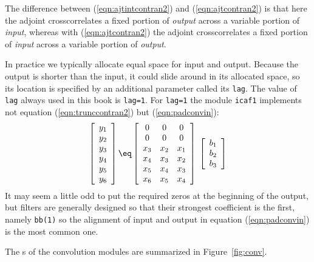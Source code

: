 The difference between (\ref{eqn:ajtintcontran2})
and (\ref{eqn:ajtcontran2}) is that here 
the adjoint crosscorrelates a fixed portion of {\em  output}
across a variable portion of {\em  input},
whereas with (\ref{eqn:ajtcontran2})
the adjoint crosscorrelates a fixed portion of {\em  input}
across a variable portion of {\em  output}.
\par
In practice we typically allocate equal space for input and output.
Because the output is shorter than the input,
it could slide around in its allocated space,
so its location is specified by an additional parameter called its {\tt lag}.
The value of {\tt lag} always used in this book is {\tt lag=1}.
For {\tt lag=1} the module \texttt{icaf1}
implements not equation (\ref{eqn:trunccontran2})
but (\ref{eqn:padconvin}):
\begin{equation}
\left[ 
\begin{array}{c}
  y_1 \\ 
  y_2 \\ 
  y_3 \\ 
  y_4 \\ 
  y_5 \\ 
  y_6 
  \end{array} \right] 
\eq
\left[ 
\begin{array}{ccc}
  0   & 0   & 0    \\
  0   & 0   & 0    \\
  x_3 & x_2 & x_1  \\
  x_4 & x_3 & x_2  \\
  x_5 & x_4 & x_3  \\
  x_6 & x_5 & x_4 
  \end{array} \right] 
\; \left[ 
\begin{array}{c}
  b_1 \\ 
  b_2 \\ 
  b_3 \end{array} \right]
\label{eqn:padconvin}
\end{equation}
It may seem a little odd to put the required zeros at the beginning
of the output, but filters are generally designed so that their
strongest coefficient is the first, namely {\tt bb(1)} so
the alignment of input and output in equation (\ref{eqn:padconvin})
is the most common one.

\par
The
s
of the convolution modules are summarized
in Figure~\ref{fig:conv}.%

